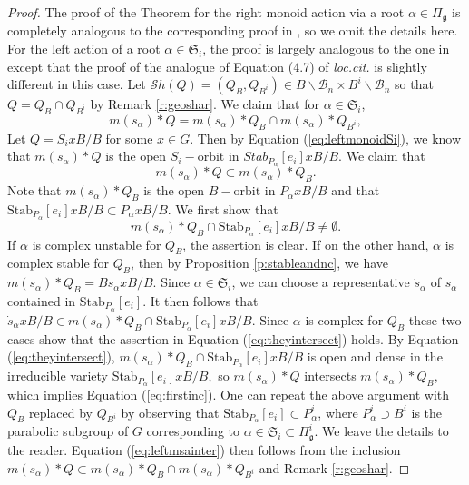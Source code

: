 \documentclass[12pt]{amsart}
\numberwithin{equation}{section}
\theoremstyle{remark}
\theoremstyle{definition}
\newcommand{\fg}{\mbox{${\mathfrak g}$}}
\newcommand{\B}{\mathcal{B}}
\newcommand{\ms}{m(s_{\alpha})}
\newcommand{\Sh}{\mathcal{S}h}
\begin{document}
\begin{proof}
The proof of the Theorem for the right monoid action via a root $\alpha\in\Pi_{\fg}$ is completely analogous to the corresponding proof in \cite{Shpairs}, so we omit the details here.  For the left action of a root $\alpha\in \mathfrak{S}_i$, the proof is largely analogous to the one in \cite{Shpairs} except that the proof of the analogue of Equation (4.7) of \emph{loc.cit.} is slightly different in this case.  Let $\Sh(Q)=(Q_B, Q_{B^{i}})\in B\backslash\B_{n}\times B^{i}\backslash\B_{n}$ so that $Q=Q_B \cap Q_{B^{i}}$ by Remark \ref{r:geoshar}.
We claim that for $\alpha\in \mathfrak{S}_i$,  
\begin{equation}\label{eq:leftmsainter}
\ms*Q=\ms*Q_{B}\cap\ms*Q_{B^{i}},
\end{equation}
Let $Q=S_{i}xB/B$ for some $x\in G$.  Then by Equation (\ref{eq:leftmonoidSi}), we know that  $\ms*Q$ is $\mbox{the open } S_{i}-\mbox{orbit in } Stab_{P_{\alpha}}[e_{i}] x B/B$.  We claim that 
\begin{equation}\label{eq:firstinc}
\ms* Q\subset \ms* Q_{B}.
\end{equation}
Note that $\ms*Q_{B}$ is $\mbox{the open } B-\mbox{orbit in } P_{\alpha}xB/B$ and that 
$\mbox{Stab}_{P_{\alpha}}[e_{i}] xB/B\subset P_{\alpha}xB/B$.  We first show that 
\begin{equation}\label{eq:theyintersect}
\ms*Q_{B}\cap \mbox{Stab}_{P_{\alpha}}[e_{i}] xB/B\neq\emptyset. 
\end{equation}
If $\alpha$ is complex unstable for $Q_{B}$, the assertion is clear.  If on the other hand, 
$\alpha$ is complex stable for $Q_{B}$, then by Proposition \ref{p:stableandnc}, we have 
$\ms*Q_{B}=Bs_{\alpha}xB/B$.  Since $\alpha\in\mathfrak{S}_i$, we can choose a representative ${\dot{s}}_{\alpha}$ of $s_{\alpha}$ contained in
$\mbox{Stab}_{P_{\alpha}}[e_{i}]$.  It then follows that 
${\dot{s}}_{\alpha} xB/B\in \ms*Q_{B}\cap \mbox{Stab}_{P_{\alpha}}[e_{i}] xB/B$.  Since $\alpha$ is complex for $Q_{B}$ these two cases show that the assertion in Equation 
(\ref{eq:theyintersect}) holds.  By Equation (\ref{eq:theyintersect}), $\ms*Q_{B} \cap \mbox{Stab}_{P_{\alpha}}[e_{i}] xB/B$ is open and dense in the irreducible variety $\mbox{Stab}_{P_{\alpha}}[e_{i}] xB/B,$ so $\ms*Q$ intersects $\ms*Q_B$, which implies Equation (\ref{eq:firstinc}).
One can repeat the above argument with $Q_{B}$ replaced by $Q_{B^{i}}$ by observing that 
$\mbox{Stab}_{P_{\alpha}}[e_{i}]\subset P_{\alpha}^{i}$, where $P_{\alpha}^{i}\supset B^{i}$ is the parabolic subgroup of $G$ corresponding to $\alpha\in\mathfrak{S}_i\subset \Pi_{\fg}^{i}$.  We leave the details to the reader.  Equation (\ref{eq:leftmsainter}) then follows from the inclusion $\ms*Q\subset \ms*Q_{B}\cap \ms*Q_{B^{i}}$ and Remark \ref{r:geoshar}.  


\end{proof}
\end{document}
